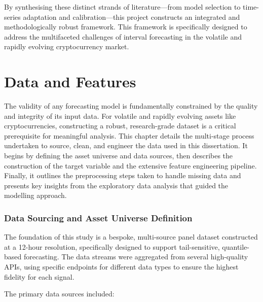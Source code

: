 \documentclass[
  a4paper,
  DIV=11,
  numbers=noendperiod]{scrreprt}
\begin{document}
By synthesising these distinct strands of literature---from model
selection to time-series adaptation and calibration---this project
constructs an integrated and methodologically robust framework. This
framework is specifically designed to address the multifaceted
challenges of interval forecasting in the volatile and rapidly evolving
cryptocurrency market.


\chapter{Data and Features}\label{data-and-features}

The validity of any forecasting model is fundamentally constrained by
the quality and integrity of its input data. For volatile and rapidly
evolving assets like cryptocurrencies, constructing a robust,
research-grade dataset is a critical prerequisite for meaningful
analysis. This chapter details the multi-stage process undertaken to
source, clean, and engineer the data used in this dissertation. It
begins by defining the asset universe and data sources, then describes
the construction of the target variable and the extensive feature
engineering pipeline. Finally, it outlines the preprocessing steps taken
to handle missing data and presents key insights from the exploratory
data analysis that guided the modelling approach.

\subsection{Data Sourcing and Asset Universe
Definition}\label{data-sourcing-and-asset-universe-definition}

The foundation of this study is a bespoke, multi-source panel dataset
constructed at a 12-hour resolution, specifically designed to support
tail-sensitive, quantile-based forecasting. The data streams were
aggregated from several high-quality APIs, using specific endpoints for
different data types to ensure the highest fidelity for each signal.

The primary data sources included:
\end{document}
